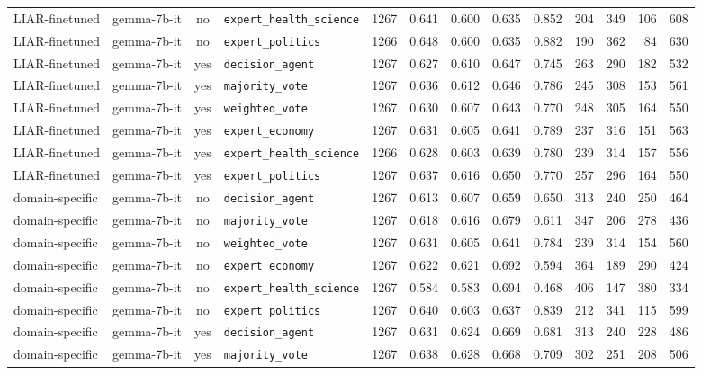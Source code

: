 \begin{landscape}
\begin{longtable}{@{}l p{3.2cm} c l r r r r r r r r r@{}}
LIAR-finetuned & gemma-7b-it & no & \texttt{expert\_health\_science} & 1267 & 0.641 & 0.600 & 0.635 & 0.852 & 204 & 349 & 106 & 608\\
LIAR-finetuned & gemma-7b-it & no & \texttt{expert\_politics} & 1266 & 0.648 & 0.600 & 0.635 & 0.882 & 190 & 362 & 84 & 630\\
LIAR-finetuned & gemma-7b-it & yes & \texttt{decision\_agent} & 1267 & 0.627 & 0.610 & 0.647 & 0.745 & 263 & 290 & 182 & 532\\
LIAR-finetuned & gemma-7b-it & yes & \texttt{majority\_vote} & 1267 & 0.636 & 0.612 & 0.646 & 0.786 & 245 & 308 & 153 & 561\\
LIAR-finetuned & gemma-7b-it & yes & \texttt{weighted\_vote} & 1267 & 0.630 & 0.607 & 0.643 & 0.770 & 248 & 305 & 164 & 550\\
LIAR-finetuned & gemma-7b-it & yes & \texttt{expert\_economy} & 1267 & 0.631 & 0.605 & 0.641 & 0.789 & 237 & 316 & 151 & 563\\
LIAR-finetuned & gemma-7b-it & yes & \texttt{expert\_health\_science} & 1266 & 0.628 & 0.603 & 0.639 & 0.780 & 239 & 314 & 157 & 556\\
LIAR-finetuned & gemma-7b-it & yes & \texttt{expert\_politics} & 1267 & 0.637 & 0.616 & 0.650 & 0.770 & 257 & 296 & 164 & 550\\
\midrule
domain-specific & gemma-7b-it & no & \texttt{decision\_agent} & 1267 & 0.613 & 0.607 & 0.659 & 0.650 & 313 & 240 & 250 & 464\\
domain-specific & gemma-7b-it & no & \texttt{majority\_vote} & 1267 & 0.618 & 0.616 & 0.679 & 0.611 & 347 & 206 & 278 & 436\\
domain-specific & gemma-7b-it & no & \texttt{weighted\_vote} & 1267 & 0.631 & 0.605 & 0.641 & 0.784 & 239 & 314 & 154 & 560\\
domain-specific & gemma-7b-it & no & \texttt{expert\_economy} & 1267 & 0.622 & 0.621 & 0.692 & 0.594 & 364 & 189 & 290 & 424\\
domain-specific & gemma-7b-it & no & \texttt{expert\_health\_science} & 1267 & 0.584 & 0.583 & 0.694 & 0.468 & 406 & 147 & 380 & 334\\
domain-specific & gemma-7b-it & no & \texttt{expert\_politics} & 1267 & 0.640 & 0.603 & 0.637 & 0.839 & 212 & 341 & 115 & 599\\
domain-specific & gemma-7b-it & yes & \texttt{decision\_agent} & 1267 & 0.631 & 0.624 & 0.669 & 0.681 & 313 & 240 & 228 & 486\\
domain-specific & gemma-7b-it & yes & \texttt{majority\_vote} & 1267 & 0.638 & 0.628 & 0.668 & 0.709 & 302 & 251 & 208 & 506\\

\end{longtable}
\end{landscape}
